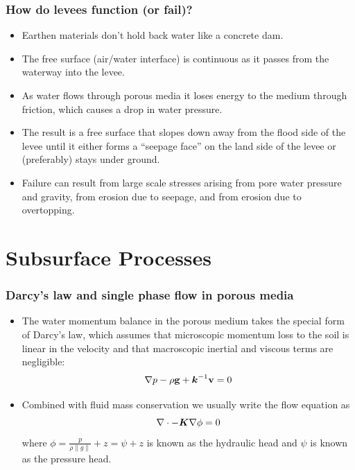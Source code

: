 \documentclass{beamer}
\begin{document}
\begin{frame}
  \frametitle{How do levees function (or fail)?}
    \begin{itemize}
    \item Earthen materials don't hold back water like a
      concrete dam.
    \item The free surface (air/water interface) is continuous as it
      passes from the waterway into the levee.
    \item As water flows through porous media it loses energy to the
      medium through friction, which causes a drop in water pressure.
    \item The result is a free surface that slopes down away from the
      flood side of the levee until it either forms a ``seepage face''
      on the land side of the levee or (preferably) stays under ground.
    \item Failure can result from large scale stresses arising from
      pore water pressure and gravity, from erosion due to seepage,
      and from erosion due to overtopping.
    \end{itemize}
\end{frame}

\section{Subsurface Processes}


\begin{frame}
  \frametitle{Darcy's law and single phase flow in porous media}
  \begin{itemize}
    \item The water momentum balance in the porous medium takes the
      special form of Darcy's law, which assumes that microscopic
      momentum loss to the soil is linear in the velocity and that
      macroscopic inertial and viscous terms are negligible:
    \begin{equation}
      \nabla p - \rho {\bf g}  + \mbox{{\boldmath ${k}$}}^{-1} {\bf v} = 0
    \end{equation}
    \item Combined with fluid mass conservation we usually write the flow equation as
      \begin{equation}
        \nabla \cdot  -\mbox{{\boldmath ${K}$}} \nabla \phi = 0 
      \end{equation}
      where $\phi = \frac{p}{\rho\|g\|} + z = \psi + z$ is known as the hydraulic head and $\psi$ is known as the pressure head.

  \end{itemize}
\end{frame}
\end{document}
